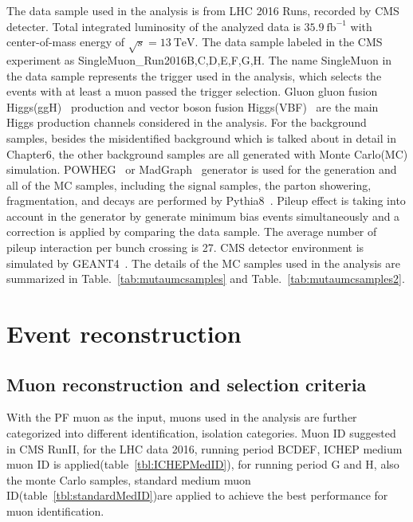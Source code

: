 The data sample used in the analysis is from LHC 2016 Runs, recorded by CMS detecter. Total integrated luminosity of the analyzed data is $35.9 ~\textrm{fb}^{-1} $ with center-of-mass energy of $ \sqrt{s}=13 ~\textrm{TeV} $. The data sample labeled in the CMS experiment as SingleMuon\_Run2016B,C,D,E,F,G,H. The name SingleMuon in the data sample represents the trigger used in the analysis, which selects the events with at least a muon passed the trigger selection. Gluon gluon fusion Higgs(ggH)~\cite{Georgi:1977gs} production and vector boson fusion Higgs(VBF)~\cite{Cahn:1986zv} are the main Higgs production channels considered in the analysis. For the background samples, besides the misidentified background which is talked about in detail in Chapter6, the other background samples are all generated with Monte Carlo(MC) simulation.  POWHEG~\cite{POWHEG-BOX} or MadGraph~\cite{Alwall:2014} generator is used for the generation and all of the MC samples, including the signal samples, the parton showering, fragmentation, and decays are performed by Pythia8~\cite{Sjostrand:2014zea}.  Pileup effect is taking into account in the generator by generate minimum bias events simultaneously and a correction is applied by comparing the data sample. The average number of pileup interaction per bunch crossing is 27. CMS detector environment is simulated by GEANT4~\cite{GEANT4}. The details of the MC samples used in the analysis are summarized in Table.~\ref{tab:mutaumcsamples} and Table.~\ref{tab:mutaumcsamples2}.






\section{Event reconstruction}


\subsection{Muon reconstruction and selection criteria}

With the PF muon as the input, muons used in the analysis are further categorized into different identification, isolation categories. Muon ID suggested in CMS RunII, for the LHC data 2016, running period BCDEF, ICHEP medium muon ID is applied(table~\ref{tbl:ICHEPMedID}), for running period G and H, also the monte Carlo samples, standard medium muon ID(table~\ref{tbl:standardMedID})are applied to achieve the best performance for muon identification.


